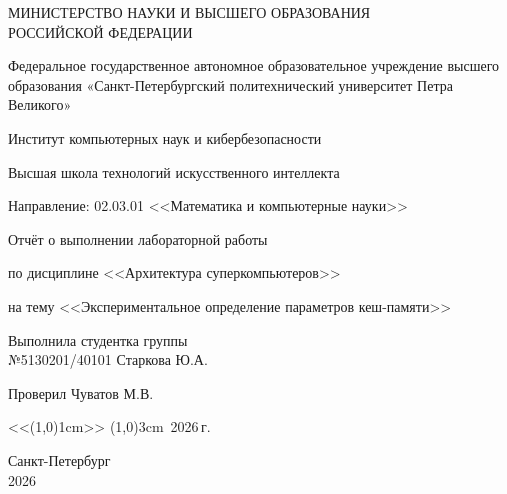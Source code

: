 \thispagestyle{empty} %

\begin{center}
    МИНИСТЕРСТВО НАУКИ И ВЫСШЕГО ОБРАЗОВАНИЯ\\ РОССИЙСКОЙ ФЕДЕРАЦИИ

    Федеральное государственное автономное образовательное учреждение высшего образования «Санкт-Петербургский политехнический университет Петра Великого»

    Институт компьютерных наук и кибербезопасности

    Высшая школа технологий искусственного интеллекта

    Направление: 02.03.01 <<Математика и компьютерные науки>>

    \vspace{3cm}
    {\Large
        Отчёт о выполнении лабораторной работы

        по дисциплине <<Архитектура суперкомпьютеров>>

        на тему <<Экспериментальное определение параметров кеш-памяти>>


    }
    \vspace{4cm}

    \begin{minipage}{\textwidth}
        Выполнила студентка группы \\
        №5130201/40101 \hfill Старкова Ю.А.

        \vspace{0.5cm}

        Проверил 
        \hfill Чуватов М.В.
    \end{minipage}

    \vspace{1cm}
    \hfill
    <<\line(1,0){1cm}>> \line(1,0){3cm}\, 2026\,г.

    \vspace{3cm}
    Санкт-Петербург \\
    2026
\end{center}
